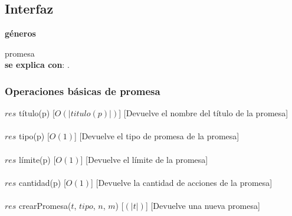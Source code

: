 \subsection{Interfaz}


   \parbox{1.7cm}{\textbf{g\'eneros}} promesa\\

  \textbf{se explica con}: .


  \subsubsection{Operaciones b\'asicas de promesa}
  {$res$ \igobs t\'itulo(p)}
  [$O(|titulo(p)|)$]
  [Devuelve el nombre del t\'itulo de la promesa]\\\\
  {$res$ \igobs tipo(p)}
  [$O(1)$]
  [Devuelve el tipo de promesa de la promesa]\\\\
  {$res$ \igobs l\'imite(p)}
  [$O(1)$]
  [Devuelve el l\'imite de la promesa]\\\\
  {$res$ \igobs cantidad(p)}
  [$O(1)$]
  [Devuelve la cantidad de acciones de la promesa]\\\\
  {$res$ \igobs crearPromesa($t$, $tipo$, $n$, $m$)}
  [$(|t|)$]
  [Devuelve una nueva promesa]\\\\



